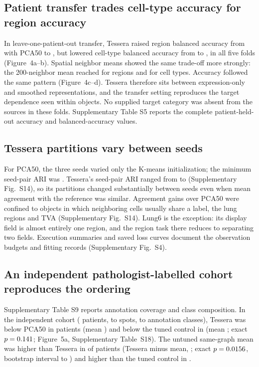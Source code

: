\documentclass[11pt]{article}
\begin{document}
\subsection{Patient transfer trades cell-type accuracy for region accuracy}
In leave-one-patient-out transfer, Tessera raised region balanced accuracy from \TransferRegionPca{} with PCA50 to \TransferRegionFull{}, but lowered cell-type balanced accuracy from \TransferCellPca{} to \TransferCellFull{}, in all five folds (Figure~4a--b). Spatial neighbor means showed the same trade-off more strongly: the 200-neighbor mean reached \TransferRegionMeanTwoHundred{} for regions and \TransferCellMeanTwoHundred{} for cell types. Accuracy followed the same pattern (Figure~4c--d). Tessera therefore sits between expression-only and smoothed representations, and the transfer setting reproduces the target dependence seen within objects. No supplied target category was absent from the sources in these folds. Supplementary Table S5 reports the complete patient-held-out accuracy and balanced-accuracy values.





\subsection{Tessera partitions vary between seeds}
For PCA50, the three seeds varied only the K-means initialization; the minimum seed-pair ARI was \StabilityPcaMin{}. Tessera's seed-pair ARI ranged from \StabilityTesseraMin{} to \StabilityTesseraMax{} (Supplementary Fig.~S14), so its partitions changed substantially between seeds even when mean agreement with the reference was similar. Agreement gains over PCA50 were confined to objects in which neighboring cells usually share a label, the lung regions and TVA (Supplementary Fig.~S14). Lung6 is the exception: its display field is almost entirely one region, and the region task there reduces to separating two fields. Execution summaries and saved loss curves document the observation budgets and fitting records (Supplementary Fig.~S4).

\subsection{An independent pathologist-labelled cohort reproduces the ordering}
Supplementary Table S9 reports annotation coverage and class composition. In the independent cohort (\HerPatients{} patients, \HerSpotsMin{} to \HerSpotsMax{} spots, \HerClassesMin{} to \HerClassesMax{} annotation classes), Tessera was below PCA50 in \HerAllTessPcaNeg{} patients (mean \HerAllTessPcaMean{}) and below the tuned control in \HerAllTessNestedNeg{} (mean \HerAllTessNestedMean{}; exact \(p=0.141{}\); Figure~5a, Supplementary Table~S18). The untuned same-graph mean was higher than Tessera in \HerAllTessUSixNeg{} of \HerPatients{} patients (Tessera minus mean, \HerAllTessUSixMean{}; exact \(p=0.0156{}\), bootstrap interval \HerAllTessUSixLo{} to \HerAllTessUSixHi{}) and higher than the tuned control in \HerAllUSixNestedPos{}.
\end{document}
